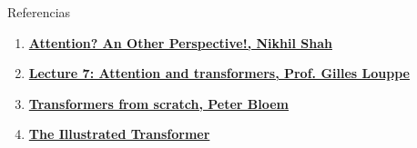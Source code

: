 \documentclass[aspectratio=169]{beamer}
\begin{document}

\begin{frame}[t]{Referencias}
  \begin{enumerate}
    \item \href{https://learningturtle.github.io/Blog/posts/attention_another_perspective_part2/}{\textbf{Attention? An Other Perspective!, Nikhil Shah}}\\
    \item \href{https://glouppe.github.io/info8010-deep-learning/?p=lecture7.md}{\textbf{Lecture 7: Attention and transformers, Prof. Gilles Louppe}}\\  
    \item \href{https://peterbloem.nl/blog/transformers}{\textbf{Transformers from scratch, Peter Bloem}}
    \item \href{https://jalammar.github.io/illustrated-transformer/}{\textbf{The Illustrated Transformer}} \\
  \end{enumerate}
\end{frame}
\end{document}
